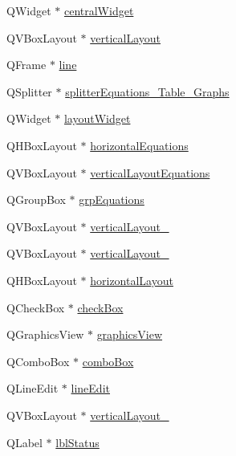 \begin{DoxyCompactItemize}
\item 
Q\+Widget $\ast$ \hyperlink{class_ui___main_window_a30075506c2116c3ed4ff25e07ae75f81}{central\+Widget}
\item 
Q\+V\+Box\+Layout $\ast$ \hyperlink{class_ui___main_window_aecd96a04789fcfec3f98d80390ad8184}{vertical\+Layout}
\item 
Q\+Frame $\ast$ \hyperlink{class_ui___main_window_a16e802a7ebd4beb9d8aba858565e51b3}{line}
\item 
Q\+Splitter $\ast$ \hyperlink{class_ui___main_window_a716482d3bfd71944406dbb1e7bd942d8}{splitter\+Equations\+\_\+\+Table\+\_\+\+Graphs}
\item 
Q\+Widget $\ast$ \hyperlink{class_ui___main_window_ab96ab0f0578098521fa69a75aa5cdde8}{layout\+Widget}
\item 
Q\+H\+Box\+Layout $\ast$ \hyperlink{class_ui___main_window_a1a99a490b592912951f4cbc5b3b49120}{horizontal\+Equations}
\item 
Q\+V\+Box\+Layout $\ast$ \hyperlink{class_ui___main_window_a6726aa72a4b420b44c48acdf85c7317d}{vertical\+Layout\+Equations}
\item 
Q\+Group\+Box $\ast$ \hyperlink{class_ui___main_window_a4a2099213c384618b9e77540365ed85b}{grp\+Equations}
\item 
Q\+V\+Box\+Layout $\ast$ \hyperlink{class_ui___main_window_a93c190b085c63a667c535ba0bbcfec7c}{vertical\+Layout\+\_}
\item 
Q\+V\+Box\+Layout $\ast$ \hyperlink{class_ui___main_window_a0c01bad60d9f422a1258e710635a2f65}{vertical\+Layout\+\_}
\item 
Q\+H\+Box\+Layout $\ast$ \hyperlink{class_ui___main_window_acd6fdc9ebacc4b25b834162380d75ce8}{horizontal\+Layout}
\item 
Q\+Check\+Box $\ast$ \hyperlink{class_ui___main_window_ae8154204ed56489a091cf3a81af1f996}{check\+Box}
\item 
Q\+Graphics\+View $\ast$ \hyperlink{class_ui___main_window_a713d8e541d9de8389ad4292131dc931a}{graphics\+View}
\item 
Q\+Combo\+Box $\ast$ \hyperlink{class_ui___main_window_af4df84479fcdbcc4c6d2d3e39046317a}{combo\+Box}
\item 
Q\+Line\+Edit $\ast$ \hyperlink{class_ui___main_window_a7a5b9a4633d64f502ce81da3202d828c}{line\+Edit}
\item 
Q\+V\+Box\+Layout $\ast$ \hyperlink{class_ui___main_window_a38b8a4b887f3b58e2a49e7905ae6f1f0}{vertical\+Layout\+\_}
\item 
Q\+Label $\ast$ \hyperlink{class_ui___main_window_a2626e69616ad31fd2f0a64360bdaba84}{lbl\+Status}

\end{DoxyCompactItemize}

